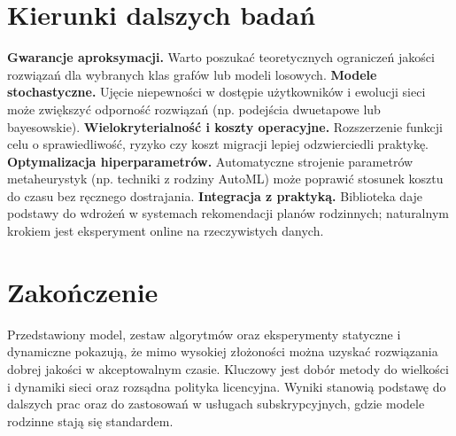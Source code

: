 \section{Kierunki dalszych badań}

\textbf{Gwarancje aproksymacji.} Warto poszukać teoretycznych ograniczeń jakości rozwiązań dla wybranych klas grafów lub modeli losowych.
\textbf{Modele stochastyczne.} Ujęcie niepewności w dostępie użytkowników i ewolucji sieci może zwiększyć odporność rozwiązań (np. podejścia dwuetapowe lub bayesowskie).
\textbf{Wielokryterialność i koszty operacyjne.} Rozszerzenie funkcji celu o sprawiedliwość, ryzyko czy koszt migracji lepiej odzwierciedli praktykę.
\textbf{Optymalizacja hiperparametrów.} Automatyczne strojenie parametrów metaheurystyk (np. techniki z rodziny AutoML) może poprawić stosunek kosztu do czasu bez ręcznego dostrajania.
\textbf{Integracja z praktyką.} Biblioteka daje podstawy do wdrożeń w systemach rekomendacji planów rodzinnych; naturalnym krokiem jest eksperyment online na rzeczywistych danych.

\section{Zakończenie}

Przedstawiony model, zestaw algorytmów oraz eksperymenty statyczne i dynamiczne pokazują, że mimo wysokiej złożoności można uzyskać rozwiązania dobrej jakości w akceptowalnym czasie. Kluczowy jest dobór metody do wielkości i dynamiki sieci oraz rozsądna polityka licencyjna. Wyniki stanowią podstawę do dalszych prac oraz do zastosowań w usługach subskrypcyjnych, gdzie modele rodzinne stają się standardem.
